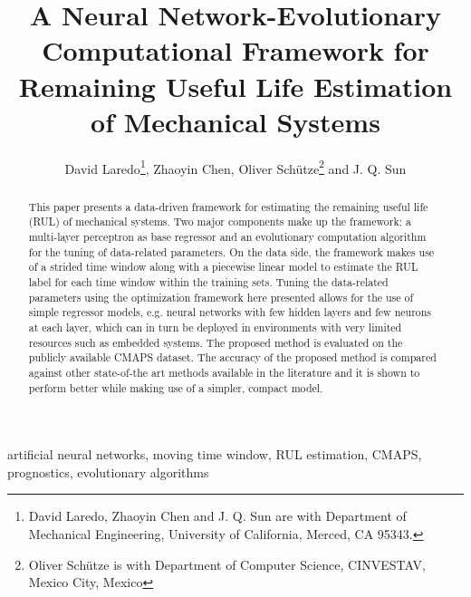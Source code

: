 
\title{A Neural Network-Evolutionary Computational Framework for Remaining Useful Life Estimation of Mechanical Systems}

\author{David Laredo\thanks{David Laredo, Zhaoyin Chen and J. Q. Sun are with Department of Mechanical Engineering, University of California, Merced, CA 95343.}, Zhaoyin Chen, Oliver Sch\"utze\thanks{Oliver Sch\"utze is with Department of Computer Science, CINVESTAV, Mexico City, Mexico} and J. Q. Sun}%


\maketitle

\begin{abstract}
This paper presents a data-driven framework for estimating the remaining useful life (RUL) of mechanical systems. Two major components make up the framework: a multi-layer perceptron as base regressor and an evolutionary computation algorithm for the tuning of data-related parameters. On the data side, the framework makes use of a strided time window along with a piecewise linear model to estimate the RUL label for each time window within the training sets. Tuning the data-related parameters using the optimization framework here presented allows for the use of simple regressor models, e.g. neural networks with few hidden layers and few neurons at each layer, which can in turn be deployed in environments with very limited resources such as embedded systems. The proposed method is evaluated on the publicly available CMAPS dataset. The accuracy of the proposed method is compared against other state-of-the art methods available in the literature and it is shown to perform better while making use of a simpler, compact model.
\end{abstract}


\begin{keywords}
artificial neural networks, moving time window, RUL estimation, CMAPS, prognostics, evolutionary algorithms
\end{keywords}

